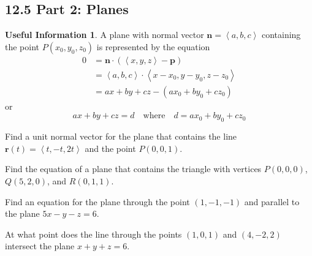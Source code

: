 \documentclass[12pt]{exam}
\newcommand{\br}{\bm{r}}
\newcommand{\gen}[1]{\left\langle #1 \right\rangle}
\theoremstyle{definition}
\newtheorem*{info}{Useful Information}
\theoremstyle{remark}
\begin{document}
\begin{questions}
\newpage

\section*{12.5 Part 2: Planes}

\begin{info}
    A plane with normal vector \(\bm{n}=\gen{a,b,c}\) containing the point 
        \(P(x_0,y_0,z_0)\) is represented by the equation
        \begin{align*}
              0 & = \bm{n}\cdot(\gen{x,y,z}-\bm{p})\\
                & = \gen{a,b,c}\cdot\gen{x-x_0,y-y_0,z-z_0}\\
                & = ax+by+cz - (ax_0+by_0+cz_0)
        \end{align*}
        or 
        \[
            ax+by+cz=d \quad \text{where} \quad d=ax_0+by_0+cz_0
        \]
    
\end{info}

\question Find a unit normal vector for the plane that contains the line \(\br(t)=\gen{t,-t,2t}\) and the point \(P(0,0,1)\).

\ifprintanswers
        \begin{solution}
        \end{solution}
    \else
        \vfill
    \fi

\question Find the equation of a plane that contains the triangle with vertices \(P(0,0,0)\), \(Q(5,2,0)\), and \(R(0,1,1)\).

\ifprintanswers
        \begin{solution}
        \end{solution}
    \else
        \vfill
    \fi 

\question Find an equation for the plane through the point \((1,-1,-1)\) and parallel to the plane \(5x-y-z=6\).

\ifprintanswers
        \begin{solution}
        \end{solution}
    \else
        \vfill
    \fi

\question At what point does the line through the points \((1,0,1)\) and \((4,-2,2)\) intersect the plane \(x+y+z=6\).

\ifprintanswers
        \begin{solution}
        \end{solution}
    \else
        \vfill
    \fi

\newpage 


\end{questions}
\end{document}
